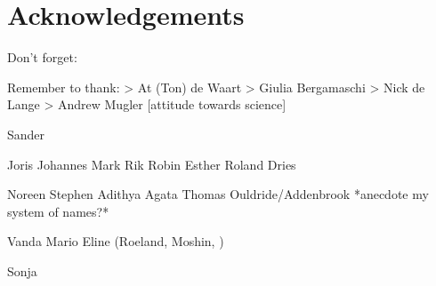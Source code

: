 



\chapter*{Acknowledgements}

Don't forget:



Remember to thank:
> At (Ton) de Waart
> Giulia Bergamaschi
> Nick de Lange
> Andrew Mugler [attitude towards science]

Sander

Joris
Johannes
Mark
Rik
Robin
Esther
Roland Dries

Noreen
Stephen
Adithya
Agata
Thomas Ouldride/Addenbrook *anecdote my system of names?*

Vanda
Mario
Eline
(Roeland, Moshin, )

Sonja


